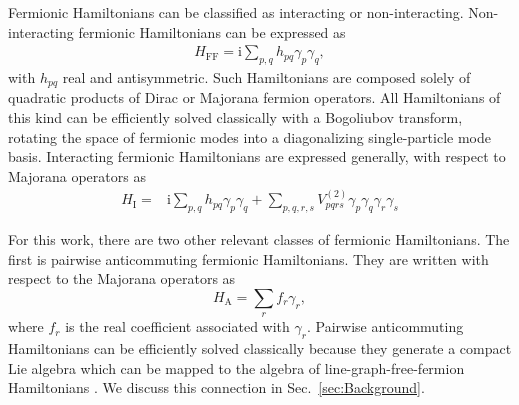 \documentclass[%
 aip,
 amsmath,amssymb,
 reprint,%
]{revtex4-1}
\newcommand{\anticommutingHamiltonian}{H_{\mathrm{A}}}
\newcommand{\lineGraphFreeFermionHamiltonian}{H_{\mathrm{FF}}}
\newcommand{\coeff}{f}
\begin{document}
Fermionic Hamiltonians %
can be classified as interacting or non-interacting. Non-interacting fermionic Hamiltonians %
can be expressed as 
\begin{align}
    \lineGraphFreeFermionHamiltonian = {\mathrm{i}}\sum_{p,q} h_{pq}\gamma_p \gamma_q,
    \label{eq:line-graph-free-fermion-hamiltonian}
\end{align}
with $h_{pq}$ real and antisymmetric. Such Hamiltonians are composed solely of quadratic products of Dirac or Majorana fermion operators. All Hamiltonians of this kind can be efficiently solved classically with a Bogoliubov transform, rotating the %
space of fermionic modes into a diagonalizing single-particle mode basis. Interacting fermionic Hamiltonians are expressed generally, with respect to Majorana operators as 
\begin{align}
    H_{\mathrm{I}} ={}& {\mathrm{i}}\sum_{p,q}  h_{pq} \gamma_p \gamma_q + \sum_{p,q,r,s}  V^{(2)}_{pqrs} \gamma_p \gamma_q \gamma_r \gamma_s
    \label{eq:interacting-fermionic-hamiltonian}
\end{align}


For this work, there are two other relevant classes of fermionic Hamiltonians. %
The first is pairwise anticommuting fermionic Hamiltonians. They are written with respect to the Majorana operators as
\begin{equation}
    \anticommutingHamiltonian = \sum_r \coeff_r \gamma_r,
    \label{eq:anticommuting-hamiltonian}
\end{equation}
where $\coeff_r$ is the real coefficient associated with $\gamma_r$.
Pairwise anticommuting Hamiltonians can be efficiently solved classically because they generate a compact Lie algebra which can be mapped to the algebra of line-graph-free-fermion Hamiltonians \cite{Chapman_Fermions}. We discuss this connection in Sec.~\ref{sec:Background}.
\end{document}
